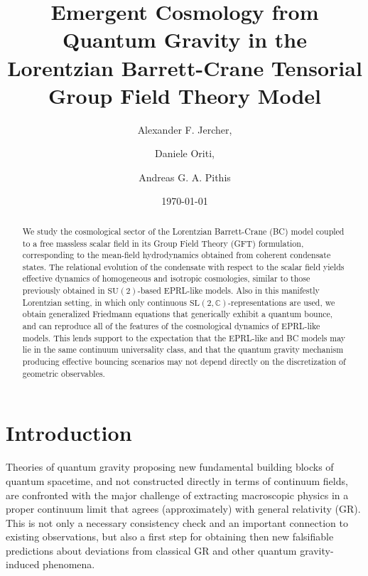\documentclass[11pt,a4paper]{article}
\begin{document}
\title{Emergent Cosmology from Quantum Gravity in the Lorentzian Barrett-Crane Tensorial Group Field Theory Model}

\author{Alexander F. Jercher,}
\author{Daniele Oriti,}
\author{Andreas G. A. Pithis}


\date{\today}

\begin{abstract}
{
We study the cosmological sector of the Lorentzian Barrett-Crane (BC) model coupled to a free massless scalar field in its Group Field Theory (GFT) formulation, corresponding to the mean-field hydrodynamics obtained from coherent condensate states. The relational evolution of the condensate with respect to the scalar field yields effective dynamics of homogeneous and isotropic cosmologies, similar to those previously obtained in $\text{SU}(2)$-based EPRL-like models. Also in this manifestly Lorentzian setting, in which only continuous $\text{SL}(2,\mathbb{C})$-representations are used, we obtain generalized Friedmann equations that generically exhibit a quantum bounce, and can reproduce all of the features of the cosmological dynamics of EPRL-like models. This lends support to the expectation that the EPRL-like and BC models may lie in the same continuum universality class, and that the quantum gravity mechanism producing effective bouncing scenarios may not depend directly on the discretization of geometric observables.
\newline
}
\end{abstract}

\maketitle

\section{Introduction}\label{sec:Introduction}

Theories of quantum gravity proposing new fundamental building blocks of quantum spacetime, and not constructed directly in terms of continuum fields, are confronted with the major challenge of extracting macroscopic physics in a proper continuum limit that agrees (approximately) with general relativity (GR). This is not only a necessary consistency check and an important connection to existing observations, but also a first step for obtaining then new falsifiable predictions about deviations from classical GR and other quantum gravity-induced phenomena. 
\end{document}
